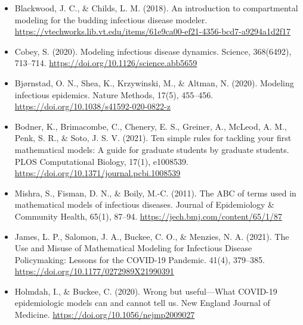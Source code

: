 \documentclass[
  ignorenonframetext,
]{beamer}
\providecommand{\tightlist}{%
  \setlength{\itemsep}{0pt}\setlength{\parskip}{0pt}}\usepackage{longtable,booktabs,array}
\begin{document}
\begin{frame}
\begin{itemize}
\tightlist
\item
  Blackwood, J. C., \& Childs, L. M. (2018). An introduction to
  compartmental modeling for the budding infectious disease modeler.
  \url{https://vtechworks.lib.vt.edu/items/61e9ca00-ef21-4356-bcd7-a9294a1d2f17}
\end{itemize}
\end{frame}

\begin{frame}
\begin{itemize}
\item
  Cobey, S. (2020). Modeling infectious disease dynamics. Science,
  368(6492), 713--714. \url{https://doi.org/10.1126/science.abb5659}
\item
  Bjørnstad, O. N., Shea, K., Krzywinski, M., \& Altman, N. (2020).
  Modeling infectious epidemics. Nature Methods, 17(5), 455--456.
  \url{https://doi.org/10.1038/s41592-020-0822-z}
\end{itemize}
\end{frame}

\begin{frame}
\begin{itemize}
\item
  Bodner, K., Brimacombe, C., Chenery, E. S., Greiner, A., McLeod, A.
  M., Penk, S. R., \& Soto, J. S. V. (2021). Ten simple rules for
  tackling your first mathematical models: A guide for graduate students
  by graduate students. PLOS Computational Biology, 17(1), e1008539.
  \url{https://doi.org/10.1371/journal.pcbi.1008539}
\item
  Mishra, S., Fisman, D. N., \& Boily, M.-C. (2011). The ABC of terms
  used in mathematical models of infectious diseases. Journal of
  Epidemiology \& Community Health, 65(1), 87--94.
  \url{https://jech.bmj.com/content/65/1/87}
\end{itemize}
\end{frame}

\begin{frame}
\begin{itemize}
\item
  James, L. P., Salomon, J. A., Buckee, C. O., \& Menzies, N. A. (2021).
  The Use and Misuse of Mathematical Modeling for Infectious Disease
  Policymaking: Lessons for the COVID-19 Pandemic. 41(4), 379--385.
  \url{https://doi.org/10.1177/0272989X21990391}
\item
  Holmdah, I., \& Buckee, C. (2020). Wrong but useful---What COVID-19
  epidemiologic models can and cannot tell us. New England Journal of
  Medicine. \url{https://doi.org/10.1056/nejmp2009027}
\end{itemize}
\end{frame}
\end{document}
